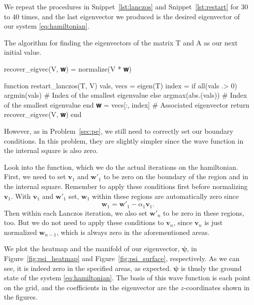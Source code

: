 We repeat the procedures in Snippet~\ref{lst:lanczos} and Snippet~\ref{lst:restart}
for $30$ to $40$ times, and the last eigenvector we produced is the desired eigenvector
of our system \eqref{eq:hamiltonian}.

\begin{algorithm}[!hbt]
    \caption{The algorithm for finding the eigenvectors of the matrix $\mathrm{T}$
        and $\mathrm{A}$ as our next initial value.}
    \label{lst:restart}
    \begin{juliacode}
recover_eigvec(V, 𝐰) = normalize(V * 𝐰)

function restart_lanczos(T, V)
    vals, vecs = eigen(T)
    index = if all(vals .> 0)
        argmin(vals)  # Index of the smallest eigenvalue
    else
        argmax(abs.(vals))  # Index of the smallest eigenvalue
    end
    𝐰 = vecs[:, index]  # Associated eigenvector
    return recover_eigvec(V, 𝐰)
end
    \end{juliacode}
\end{algorithm}

However, as in Problem~\ref{sec:pe}, we still need to correctly set our boundary
conditions. In this problem, they are slightly simpler since the wave function
in the internal square is also zero.

Look into the  function, which we do the actual iterations on
the hamiltonian.
First, we need to set $\bm{v}_1$ and $\bm{w}'_1$ to be zero on the boundary of the region
and in the internal square. Remember to apply these conditions first before
normalizing $\bm{v}_1$. With $\bm{v}_1$ and $\bm{w}'_1$ set, $\bm{w}_1$ within these
regions are automatically zero since
%
\begin{equation}
    \bm{w}_1 = \bm{w}'_1 - \alpha_1 \bm{v}_1.
\end{equation}
%
Then within each Lanczos iteration, we also set $\bm{w}'_n$ to be zero in these regions,
too. But we do not need to apply these conditions to $\bm{v}_n$,
since $\bm{v}_n$ is just normalized $\bm{w}_{n-1}$, which is always zero
in the aforementioned areas.

We plot the heatmap and the manifold of our eigenvector, $\bm{\psi}$, in
Figure~\ref{fig:psi_heatmap} and Figure~\ref{fig:psi_surface}, respectively.
As we can see, it is indeed zero in the specified areas, as expected.
$\bm{\psi}$ is thusly the ground state of the system \eqref{eq:hamiltonian}.
The basis of this wave function is each point on the grid, and the coefficients
in the eigenvector are the $z$-coordinates shown in the figures.

